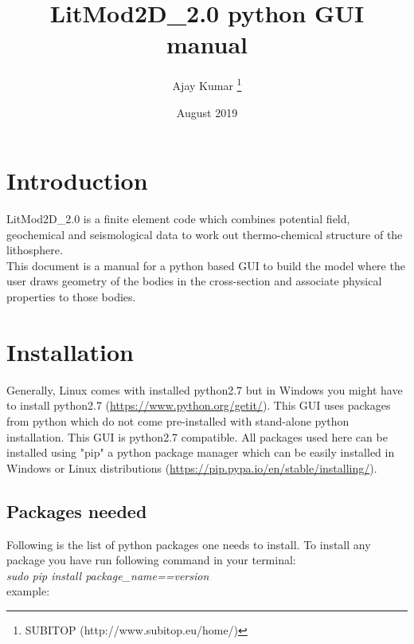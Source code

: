 \documentclass[14pt]{article}
\title{LitMod2D\_2.0 python GUI manual}
\author[1]{Ajay Kumar \thanks{SUBITOP (http://www.subitop.eu/home/)}}
\affil[1]{Group of Dynamics of the Lithosphere, ICTJA-CSIC Barcelona, Spain \\ Email: ajay6763@gmail.com}
\date{August 2019}
\begin{document}
\begin{titlepage}
\maketitle
\end{titlepage}

\section{Introduction}
LitMod2D\_2.0 is a finite element code which combines potential field, geochemical and seismological data to work out thermo-chemical structure of the lithosphere.\\
This document is a manual for a python based GUI to build the model where the user draws geometry of the bodies in the cross-section and associate physical properties to those bodies.

\section{Installation}
Generally, Linux comes with installed python2.7 but in Windows you might have to install python2.7 (\url{https://www.python.org/getit/}).
This GUI uses packages from python which do not come pre-installed with stand-alone python installation. This GUI is python2.7 compatible. All packages used here can be installed using "pip" a python package manager which can be easily installed in Windows or Linux distributions (\url{https://pip.pypa.io/en/stable/installing/}).

\subsection{Packages needed}
Following is the list of python packages one needs to install. To install any package you have run following command in your terminal: \\

\textit{sudo pip install {package\_name}=={version}} \\
example: \\
\end{document}
